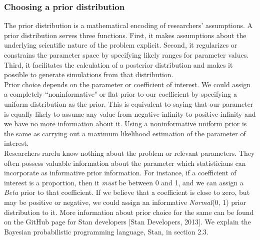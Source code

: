 \documentclass{article}
\begin{document}
\subsubsection{Choosing a prior distribution}
The prior distribution is a mathematical encoding of researchers' assumptions. A prior distribution serves three functions. First, it makes assumptions about the underlying scientific nature of the problem explicit. Second, it regularizes or constrains the parameter space by specifying likely ranges for parameter values. Third, it facilitates the calculation of a posterior distribution and makes it possible to generate simulations from that distribution. \\
Prior choice depends on the parameter or coefficient of interest.  We could assign a completely ``noninformative" or flat prior to our coefficient by specifying a uniform distribution as the prior. This is equivalent to saying that our parameter is equally likely to assume any value from negative infinity to positive infinity and we have no more information about it. Using a noninformative uniform prior is the same as carrying out a maximum likelihood estimation of the parameter of interest. \\
Researchers rarelu know nothing about the problem or relevant parameters. They often possess valuable information about the parameter which statisticians can incorporate as informative prior information. For instance, if a coefficient of interest is a proportion, then it \emph{must} be between 0 and 1, and we can assign a \emph{Beta} prior to that coefficient.  If we believe that a coefficient is close to zero, but may be positive or negative, we could assign an informative \emph{Normal}(0, 1) prior distribution to it.  More information about prior choice for the same can be found on the GitHub page for Stan developers [Stan Developers, 2013]. We explain the Bayesian probabilistic programming language, Stan, in section 2.3.\\
\end{document}
